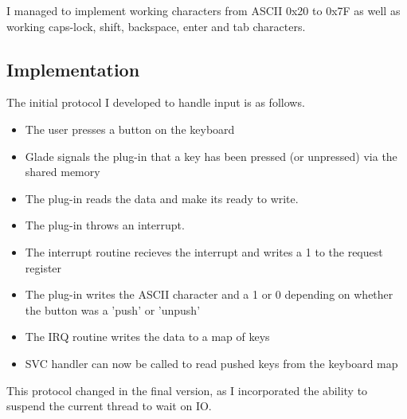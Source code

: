 I managed to implement working characters from ASCII 0x20 to 0x7F as well as working caps-lock, shift, backspace, enter and tab characters. 



\subsection{Implementation}
The initial protocol I developed to handle input is as follows.

\begin{itemize}
	\item The user presses a button on the keyboard
	\item Glade signals the plug-in that a key has been pressed (or unpressed) via the shared memory
	\item The plug-in reads the data and make its ready to write.
	\item The plug-in throws an interrupt.
	\item The interrupt routine recieves the interrupt and writes a 1 to the request register
	\item The plug-in writes the ASCII character and a 1 or 0 depending on whether the button was a 'push' or 'unpush'
	\item The IRQ routine writes the data to a map of keys
	\item SVC handler can now be called to read pushed keys from the keyboard map
\end{itemize}

This protocol changed in the final version, as I incorporated the ability to suspend the current thread to wait on IO.




















